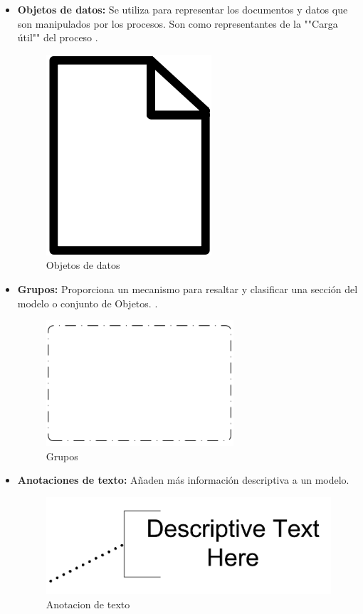 \begin{itemize}
	\item \textbf{Objetos de datos: }Se utiliza para representar los documentos y datos que son manipulados por los procesos. Son como representantes de la ""Carga útil"" del proceso \citep{stephena2009}.
	\begin{figure}[H]
		\centering
		\includegraphics[scale=0.3]{Capitulo2/imagenes/ObjetoDeDato.png}
		\caption{Objetos de datos}
		\label{Odatos}
	\end{figure}
	
	\item \textbf{Grupos: }Proporciona un mecanismo para resaltar y clasificar una sección del modelo o conjunto de Objetos. \citep{stephena2009}.
	\begin{figure}[H]
		\centering
		\includegraphics[scale=0.3]{Capitulo2/imagenes/Grupo.png}
		\caption{Grupos}
		\label{Grupos}
	\end{figure}
	
	\item \textbf{Anotaciones de texto: }Añaden más información descriptiva a un modelo.
	\begin{figure}[H]
		\centering
		\includegraphics[scale=0.3]{Capitulo2/imagenes/Anotacion.png}
		\caption{Anotacion de texto}
		\label{Atexto}
	\end{figure}
	
\end{itemize} 

